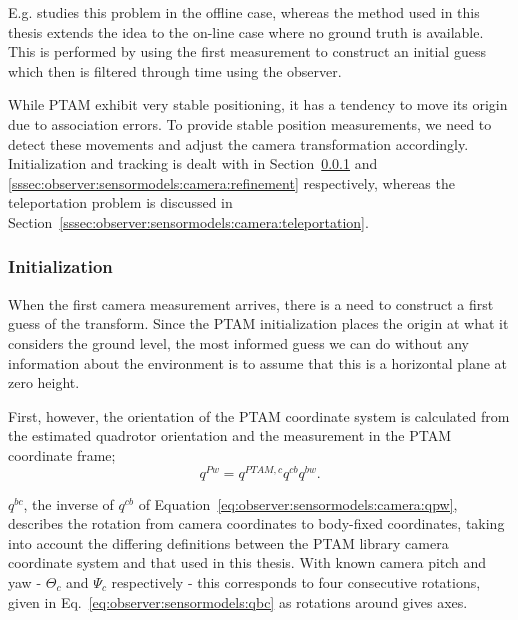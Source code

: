     E.g. \citep{hayashi2010} studies this problem in the offline case,
    whereas the method used in this thesis extends the idea to the on-line
    case where no ground truth is available. This is performed by using the
    first measurement to construct an initial guess which then is filtered
    through time using the observer.

    While PTAM exhibit very stable positioning, it has a tendency to move
    its origin due to association errors. To provide stable position
    measurements, we need to detect these movements and adjust the
    camera transformation accordingly. Initialization and tracking is dealt with in
    Section~\ref{sssec:observer:sensormodels:camera:initialization} and \ref{sssec:observer:sensormodels:camera:refinement}
    respectively, whereas the teleportation problem is discussed in
    Section~\ref{sssec:observer:sensormodels:camera:teleportation}.

    \subsubsection{Initialization}
        \label{sssec:observer:sensormodels:camera:initialization}
        When the first camera measurement arrives, there is a need to construct a
        first guess of the transform. Since the PTAM initialization places
        the origin at what it considers the ground level, the most informed
        guess we can do without any information about the environment is
        to assume that this is a horizontal plane at zero height.

        First, however, the orientation of the PTAM coordinate system is calculated
        from the estimated quadrotor orientation and the measurement in the
        PTAM coordinate frame;
        \begin{equation}
            \label{eq:observer:sensormodels:camera:qpw}
            q^{Pw} = q^{PTAM,c} q^{cb} q^{bw}.
        \end{equation}

        $q^{bc}$, the inverse of $q^{cb}$ of Equation~\ref{eq:observer:sensormodels:camera:qpw},
        describes the rotation from camera coordinates to body-fixed coordinates, taking
        into account the differing definitions between the PTAM library
        camera coordinate system and that used in this thesis.
        With known camera pitch and yaw - $\Theta_{c}$ and $\Psi_{c}$ respectively -
        this  corresponds to four consecutive rotations, given in
        Eq.~\eqref{eq:observer:sensormodels:qbc} as rotations around gives axes.


